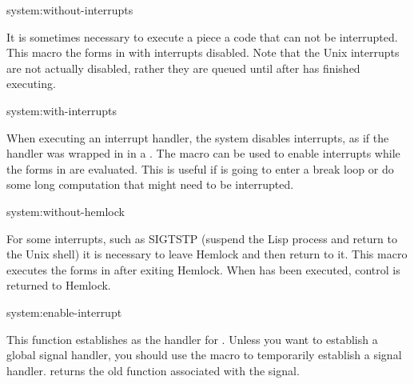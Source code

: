 \begin{defmac}{system:}{without-interrupts}{}
  
  It is sometimes necessary to execute a piece a code that can not be
  interrupted.  This macro the forms in  with interrupts
  disabled.  Note that the Unix interrupts are not actually disabled,
  rather they are queued until after  has finished
  executing.
\end{defmac}

\begin{defmac}{system:}{with-interrupts}{}
  
  When executing an interrupt handler, the system disables interrupts,
  as if the handler was wrapped in in a .
  The macro  can be used to enable interrupts
  while the forms in  are evaluated.  This is useful if
   is going to enter a break loop or do some long
  computation that might need to be interrupted.
\end{defmac}

\begin{defmac}{system:}{without-hemlock}{}
  
  For some interrupts, such as SIGTSTP (suspend the Lisp process and
  return to the Unix shell) it is necessary to leave Hemlock and then
  return to it.  This macro executes the forms in  after
  exiting Hemlock.  When  has been executed, control is
  returned to Hemlock.
\end{defmac}

\begin{defun}{system:}{enable-interrupt}{%
    }
  
  This function establishes  as the handler for
  .
  Unless you want to establish a global signal handler, you should use
  the macro  to temporarily establish a
  signal handler.  
   returns the old function associated with the
  signal.  
\end{defun}

